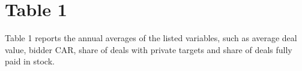 \newpage
\section*{Table 1}

Table 1 reports the annual averages of the listed variables, such as average deal value, bidder CAR, share of deals with private targets and share of deals fully paid in stock. 

